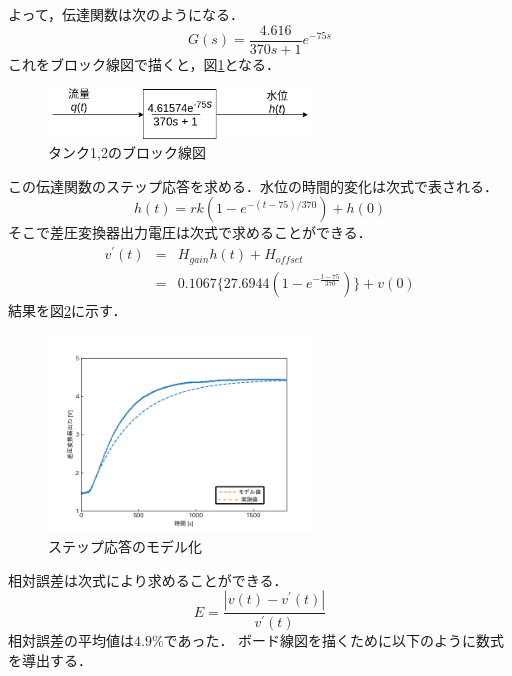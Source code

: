 \documentclass[12pt]{jsarticle}
\begin{document}
よって，伝達関数は次のようになる．
\begin{equation}
  \label{}
  G(s) = \frac{4.616}{370s+1}e^{-75s}
\end{equation}
これをブロック線図で描くと，図\ref{Tank_BlockDiag}となる．
\begin{figure}[tb]
  \begin{center}
    \includegraphics[clip,width=7.0cm]{../img/Tank_BlockDiag.png}
    \caption{タンク1,2のブロック線図}
    \label{Tank_BlockDiag}
  \end{center}
\end{figure}

この伝達関数のステップ応答を求める．水位の時間的変化は次式で表される．
\begin{equation}
  \label{}
  h(t) = rk(1 - e^{-(t - 75)/370}) + h(0)
\end{equation}
そこで差圧変換器出力電圧は次式で求めることができる．
\begin{eqnarray}
  \label{}
  v^{\prime}(t) &=& H_{gain}h(t) + H_{offset} \\
  &=& 0.1067\{27.6944(1-e^{-\frac{t-75}{370}})\} + v(0)\nonumber
\end{eqnarray}
結果を図\ref{StepResponseModeling}に示す．
\begin{figure}[tb]
  \begin{center}
    \includegraphics[clip,width=7.0cm]{../graph/stepResponse_approximity.png}
    \caption{ステップ応答のモデル化}
    \label{StepResponseModeling}
  \end{center}
\end{figure}
相対誤差は次式により求めることができる．
\begin{equation}
  E = \frac{|v(t) - v^{\prime}(t)|}{v^{\prime}(t)}
\end{equation}
相対誤差の平均値は$4.9\%$であった．
ボード線図を描くために以下のように数式を導出する．%
\end{document}
